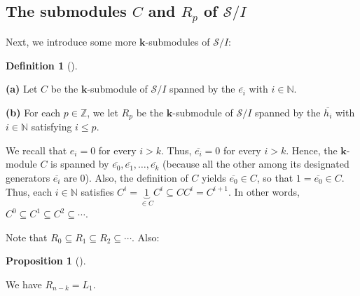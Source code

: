 \documentclass[numbers=enddot,12pt,final,onecolumn,notitlepage]{scrartcl}%
\theoremstyle{definition}
\newtheorem{prop}[theo]{Proposition}
\newenvironment{proposition}[1][]
{\begin{prop}[#1]\begin{leftbar}}
{\end{leftbar}\end{prop}}
\newtheorem{defi}[theo]{Definition}
\newenvironment{definition}[1][]
{\begin{defi}[#1]\begin{leftbar}}
{\end{leftbar}\end{defi}}
\begin{document}
\subsection{The submodules $C$ and $R_{p}$ of $\mathcal{S}/I$}

Next, we introduce some more $\mathbf{k}$-submodules of $\mathcal{S}/I$:

\begin{definition}
\textbf{(a)} Let $C$ be the $\mathbf{k}$-submodule of $\mathcal{S}/I$ spanned
by the $\overline{e_{i}}$ with $i\in\mathbb{N}$.

\textbf{(b)} For each $p\in\mathbb{Z}$, we let $R_{p}$ be the $\mathbf{k}%
$-submodule of $\mathcal{S}/I$ spanned by the $\overline{h_{i}}$ with
$i\in\mathbb{N}$ satisfying $i\leq p$.
\end{definition}

We recall that $e_{i}=0$ for every $i>k$. Thus, $\overline{e_{i}}=0$ for every
$i>k$. Hence, the $\mathbf{k}$-module $C$ is spanned by $\overline{e_{0}%
},\overline{e_{1}},\ldots,\overline{e_{k}}$ (because all the other among its
designated generators $\overline{e_{i}}$ are $0$). Also, the definition of $C$
yields $\overline{e_{0}}\in C$, so that $1=\overline{e_{0}}\in C$. Thus, each
$i\in\mathbb{N}$ satisfies $C^{i}=\underbrace{1}_{\in C}C^{i}\subseteq
CC^{i}=C^{i+1}$. In other words, $C^{0}\subseteq C^{1}\subseteq C^{2}%
\subseteq\cdots$.

Note that $R_{0}\subseteq R_{1}\subseteq R_{2}\subseteq\cdots$. Also:

\begin{proposition}
\label{prop.R.Rn-k}We have $R_{n-k}=L_{1}$.
\end{proposition}
\end{document}
